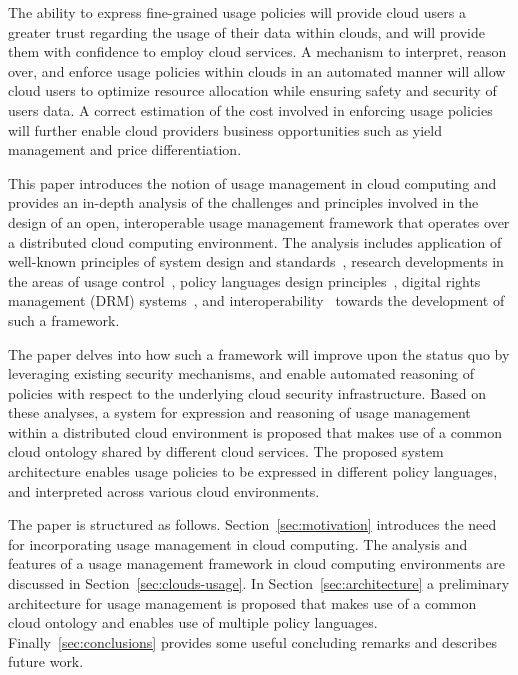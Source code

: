 \documentclass[times, 10pt,twocolumn]{article}
\begin{document}
 The ability to express fine-grained usage policies will provide cloud users a greater trust regarding the usage of their data within clouds, and will provide them with confidence to employ cloud services. A mechanism to interpret, reason over, and enforce usage policies within clouds in an automated manner will allow cloud users to optimize resource allocation while ensuring safety and security of users data. A correct estimation of the cost involved in enforcing usage policies will further enable cloud providers business opportunities such as yield management and price differentiation. 

This paper introduces the notion of usage management in cloud computing and provides an in-depth analysis of the challenges and principles involved in the design of an open, interoperable usage management framework that operates over a distributed cloud computing environment. The analysis includes application of well-known principles of system design and standards~\cite{BlCl:01,Cl:88,ClWrSoBr:02}, research developments in the areas of usage control~\cite{PaSa:04,JaHeLa:10}, policy languages design principles~\cite{JaHeMa:06}, digital rights management (DRM) systems~\cite{JaHe:09},  and interoperability~\cite{JaHe:04,HeJa:05,KoLaMaMi:04,coral,marlin} towards the development of such a framework.

 The paper delves into how such a framework will improve upon the status quo by leveraging  existing security mechanisms, and enable automated reasoning of policies with respect to the underlying cloud security infrastructure. Based on these analyses, a system for expression and reasoning of usage management within a distributed cloud environment is proposed that makes use of a common cloud ontology shared by different cloud services. The proposed system architecture enables usage policies to be expressed in different policy languages, and interpreted across various cloud environments. 

The paper is structured as follows. Section~\ref{sec:motivation} introduces the need for incorporating usage management in cloud computing. The analysis and features of a usage management framework in cloud computing environments are discussed in Section~\ref{sec:clouds-usage}. In Section~\ref{sec:architecture} a preliminary architecture for usage management is proposed that makes use of a common cloud ontology and enables use of multiple policy languages. Finally~\ref{sec:conclusions} provides some useful concluding remarks and describes future work. 
\end{document}
